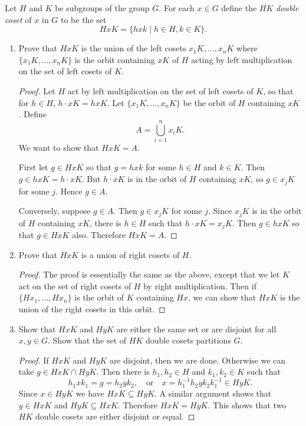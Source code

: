  Let $H$ and $K$ be subgroups of the group $G$. For each
$x\in G$ define the $HK$ {\em double coset} of $x$ in $G$ to be the
set
\begin{equation*}
  HxK = \{hxk \mid h\in H, k\in K\}.
\end{equation*}
\begin{enumerate}
\item Prove that $HxK$ is the union of the left cosets
  $x_1K,\dots,x_nK$ where $\{x_1K,\dots,x_nK\}$ is the orbit
  containing $xK$ of $H$ acting by left multiplication on the set of
  left cosets of $K$.
  \begin{proof}
    Let $H$ act by left multiplication on the set of left cosets of
    $K$, so that for $h\in H$, $h\cdot xK = hxK$. Let
    $\{x_1K,\dots,x_nK\}$ be the orbit of $H$ containing $xK$. Define
    \begin{equation*}
      A = \bigcup_{i=1}^nx_iK.
    \end{equation*}
    We want to show that $HxK = A$.

    First let $g\in HxK$ so that $g = hxk$ for some $h\in H$ and
    $k\in K$. Then $g\in hxK = h\cdot xK$. But $h\cdot xK$ is in the
    orbit of $H$ containing $xK$, so $g\in x_jK$ for some $j$. Hence
    $g\in A$.

    Conversely, suppose $g\in A$. Then $g\in x_jK$ for some $j$. Since
    $x_jK$ is in the orbit of $H$ containing $xK$, there is $h\in H$
    such that $h\cdot xK = x_jK$. Then $g\in hxK$ so that $g\in HxK$
    also. Therefore $HxK = A$.
  \end{proof}

\item Prove that $HxK$ is a union of right cosets of $H$.
  \begin{proof}
    The proof is essentially the same as the above, except that we let
    $K$ act on the set of right cosets of $H$ by right
    multiplication. Then if $\{Hx_1,\dots,Hx_n\}$ is the orbit of $K$
    containing $Hx$, we can show that $HxK$ is the union of the right
    cosets in this orbit.
  \end{proof}

\item Show that $HxK$ and $HyK$ are either the same set or are
  disjoint for all $x,y\in G$. Show that the set of $HK$ double cosets
  partitions $G$.
  \begin{proof}
    If $HxK$ and $HyK$ are disjoint, then we are done. Otherwise we
    can take $g\in HxK\cap HyK$. Then there is $h_1,h_2\in H$ and
    $k_1,k_2\in K$ such that
    \begin{equation*}
      h_1xk_1 = g = h_2yk_2,
      \quad\text{or}\quad
      x = h_1^{-1}h_2yk_2k_1^{-1}\in HyK.
    \end{equation*}
    Since $x\in HyK$ we have $HxK\subseteq HyK$. A similar argument
    shows that $y\in HxK$ and $HyK\subseteq HxK$. Therefore
    $HxK = HyK$. This shows that two $HK$ double cosets are either
    disjoint or equal.


\end{proof}
\end{enumerate}

